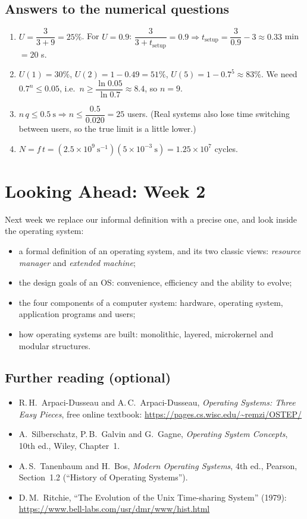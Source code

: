 \documentclass[11pt,a4paper]{article}
\begin{document}
\subsection*{Answers to the numerical questions}
\begin{enumerate}[leftmargin=1.6em,start=11]
  \item $U = \dfrac{3}{3+9} = 25\%$. For $U = 0.9$: $\dfrac{3}{3+t_{\text{setup}}} = 0.9 \Rightarrow t_{\text{setup}} = \dfrac{3}{0.9} - 3 \approx 0.33$ min $= 20$ s.
  \item $U(1) = 30\%$, $U(2) = 1 - 0.49 = 51\%$, $U(5) = 1 - 0.7^{5} \approx 83\%$. We need $0.7^{n} \leq 0.05$, i.e.\ $n \geq \dfrac{\ln 0.05}{\ln 0.7} \approx 8.4$, so $n = 9$.
  \item $n\,q \leq 0.5\ \text{s} \Rightarrow n \leq \dfrac{0.5}{0.020} = 25$ users. (Real systems also lose time switching between users, so the true limit is a little lower.)
  \item $N = f\,t = (2.5\times10^{9}\ \text{s}^{-1})(5\times10^{-3}\ \text{s}) = 1.25\times10^{7}$ cycles.
\end{enumerate}

\section{Looking Ahead: Week 2}

Next week we replace our informal definition with a precise one, and look inside the operating system:
\begin{itemize}
  \item a formal definition of an operating system, and its two classic views: \emph{resource manager} and \emph{extended machine};
  \item the design goals of an OS: convenience, efficiency and the ability to evolve;
  \item the four components of a computer system: hardware, operating system, application programs and users;
  \item how operating systems are built: monolithic, layered, microkernel and modular structures.
\end{itemize}

\subsection*{Further reading (optional)}
\begin{itemize}
  \item R.\,H.\ Arpaci-Dusseau and A.\,C.\ Arpaci-Dusseau, \emph{Operating Systems: Three Easy Pieces}, free online textbook: \url{https://pages.cs.wisc.edu/~remzi/OSTEP/}
  \item A.\ Silberschatz, P.\,B.\ Galvin and G.\ Gagne, \emph{Operating System Concepts}, 10th ed., Wiley, Chapter~1.
  \item A.\,S.\ Tanenbaum and H.\ Bos, \emph{Modern Operating Systems}, 4th ed., Pearson, Section~1.2 (``History of Operating Systems'').
  \item D.\,M.\ Ritchie, ``The Evolution of the Unix Time-sharing System'' (1979): \url{https://www.bell-labs.com/usr/dmr/www/hist.html}
\end{itemize}
\end{document}
